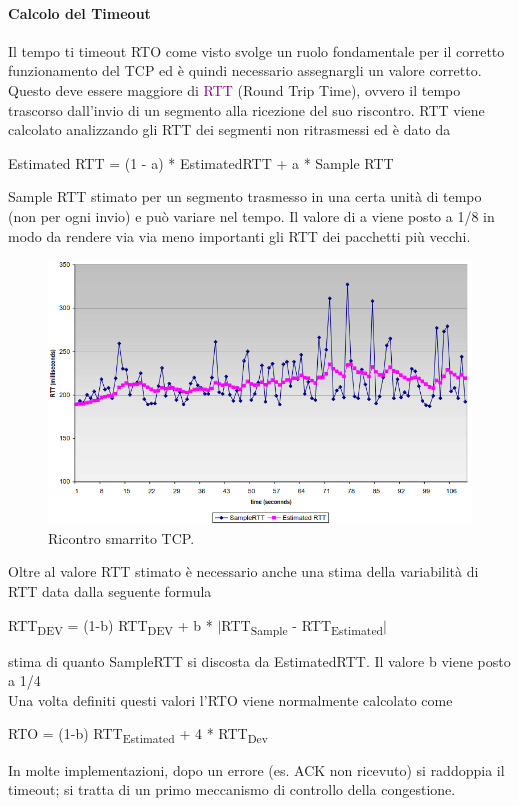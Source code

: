 \paragraph{Calcolo del Timeout}
Il tempo ti timeout RTO come visto svolge un ruolo fondamentale per il corretto funzionamento del TCP ed è quindi necessario assegnargli un valore corretto.
Questo deve essere maggiore di \textcolor{purple}{RTT} (Round Trip Time), ovvero il tempo trascorso dall'invio di un segmento alla ricezione del suo riscontro.
RTT viene calcolato analizzando gli RTT dei segmenti non ritrasmessi ed è dato da
\begin{center}
    Estimated RTT = (1 - a) * EstimatedRTT + a * Sample RTT
\end{center}
Sample RTT stimato per un segmento trasmesso in una certa unità di tempo (non per ogni invio) e può variare nel tempo.
Il valore di a viene posto a 1/8 in modo da rendere via via meno importanti gli RTT dei pacchetti più vecchi.
\begin{figure}[h]
    \centering
    \includegraphics[scale=0.46]{Immagini/EstimatedRTT.png}
    \caption{Ricontro smarrito TCP.}
\end{figure}
Oltre al valore RTT stimato è necessario anche una stima della variabilità di RTT data dalla seguente formula
\begin{center}
    RTT\textsubscript{DEV} = (1-b) RTT\textsubscript{DEV} + b * $|$RTT\textsubscript{Sample} - RTT\textsubscript{Estimated}$|$
\end{center}
stima di quanto SampleRTT si discosta da EstimatedRTT.
Il valore b viene posto a 1/4
\\Una volta definiti questi valori l'RTO viene normalmente calcolato come
\begin{center}
    RTO = (1-b) RTT\textsubscript{Estimated} + 4 * RTT\textsubscript{Dev}
\end{center}
In molte implementazioni, dopo un errore (es. ACK non ricevuto) si raddoppia il timeout; si tratta di un primo meccanismo di controllo della congestione.

